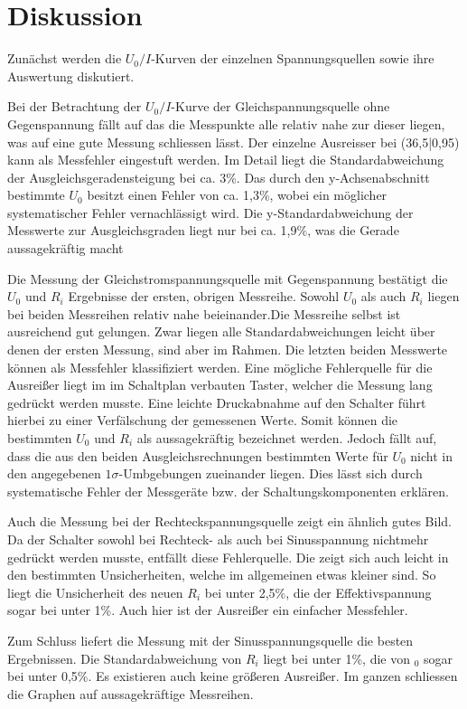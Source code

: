 \section{Diskussion}
\label{sec:Diskussion}


Zunächst werden die $U_0/I $-Kurven der einzelnen Spannungsquellen sowie ihre Auswertung diskutiert.

Bei der Betrachtung der $U_0 /I$-Kurve der Gleichspannungsquelle ohne Gegenspannung
fällt auf das die Messpunkte alle relativ nahe zur dieser liegen, was auf eine gute
Messung schliessen lässt. Der einzelne Ausreisser bei (36,5|0,95) kann als Messfehler
eingestuft werden.
 Im Detail liegt die Standardabweichung der Ausgleichsgeradensteigung bei ca. 3\%. Das durch den
 y-Achsenabschnitt bestimmte $U_0$ besitzt einen Fehler von ca. 1,3\%, wobei ein möglicher
 systematischer Fehler vernachlässigt wird.
 Die y-Standardabweichung der Messwerte zur Ausgleichsgraden liegt nur bei ca. 1,9\%,
  was die Gerade aussagekräftig macht

Die Messung der Gleichstromspannungsquelle mit Gegenspannung bestätigt die $U_0$ und $R_i$ Ergebnisse
der ersten, obrigen Messreihe. Sowohl $U_0$ als auch $R_i$ liegen bei beiden Messreihen
 relativ nahe beieinander.Die Messreihe selbst ist ausreichend gut gelungen.
 Zwar liegen alle Standardabweichungen leicht über denen der ersten Messung,
 sind aber im Rahmen.
 Die letzten beiden Messwerte können als Messfehler klassifiziert werden.
 Eine mögliche Fehlerquelle für die Ausreißer liegt im im Schaltplan verbauten Taster,
  welcher die Messung lang gedrückt werden musste. Eine leichte Druckabnahme auf den Schalter
  führt hierbei zu einer Verfälschung der gemessenen Werte.
 Somit können die bestimmten $U_0$ und $R_i$ als aussagekräftig bezeichnet werden.
 Jedoch fällt auf, dass die aus den beiden Ausgleichsrechnungen bestimmten Werte für $U_0$
 nicht in den angegebenen $1\sigma$-Umbgebungen zueinander liegen.
 Dies lässt sich durch systematische Fehler der Messgeräte bzw. der Schaltungskomponenten erklären.


Auch die Messung bei der Rechteckspannungsquelle zeigt ein ähnlich gutes Bild.
 Da  der Schalter sowohl bei Rechteck- als auch bei Sinusspannung nichtmehr gedrückt werden musste,
entfällt diese Fehlerquelle. Die zeigt sich auch leicht in den bestimmten Unsicherheiten,
welche im allgemeinen etwas kleiner sind. So liegt die Unsicherheit des neuen $R_i$ bei
unter 2,5\%, die der Effektivspannung sogar bei unter 1\%. Auch hier ist der Ausreißer
ein einfacher Messfehler.

Zum Schluss liefert die Messung mit der Sinusspannungsquelle die besten Ergebnissen.
Die Standardabweichung von $R_i$ liegt bei unter 1\%, die von $_0$ sogar bei unter 0,5\%.
 Es existieren auch keine größeren Ausreißer.
 Im ganzen schliessen die Graphen auf aussagekräftige Messreihen.

